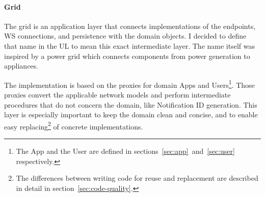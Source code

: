 \paragraph*{Grid}\label{sec:grid}

The grid is an application layer
that connects implementations of
the endpoints, \ac{WS} connections, and persistence
with the domain objects.
I decided to define that name in the \ac{UL}
to mean this exact intermediate layer.
The name itself was inspired by a power grid
which connects components
from power generation
to appliances.

The implementation is based on the proxies
for domain Apps and Users\footnote{
  The App and the User are defined in
  sections~\ref{sec:app}~and~\ref{sec:user}
  respectively.
}.
Those proxies convert the applicable network models
and perform intermediate procedures
that do not concern the domain,
like Notification \ac{ID} generation.
This layer is especially important
to keep the domain clean and concise,
and to enable easy replacing\footnote{
  The differences between writing code
  for reuse and replacement are described in detail
  in section~\ref{sec:code-quality}.
}
of concrete implementations.
